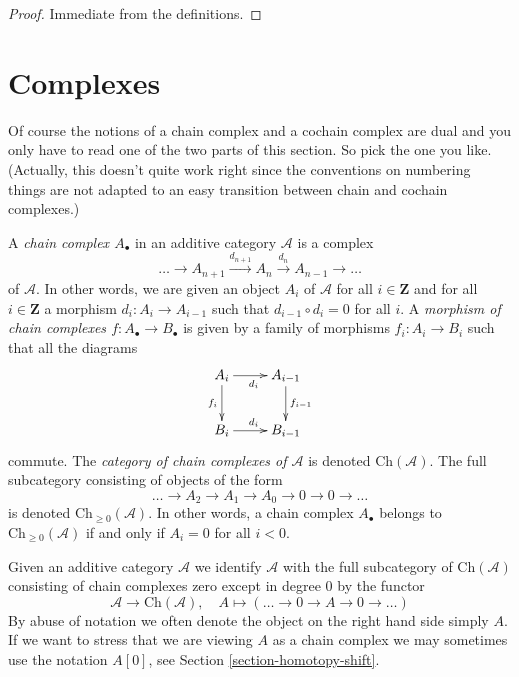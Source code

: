 \begin{proof}
Immediate from the definitions.
\end{proof}







\section{Complexes}
\label{section-complexes}

\noindent
Of course the notions of a chain complex and a cochain complex
are dual and you only have to read one of the two parts of
this section. So pick the one you like. (Actually, this doesn't
quite work right since the conventions on numbering things
are not adapted to an easy transition between chain and cochain
complexes.)

\medskip\noindent
A {\it chain complex $A_\bullet$} in an additive category $\mathcal{A}$
is a complex
$$
\ldots \to
A_{n + 1} \xrightarrow{d_{n + 1}}
A_n \xrightarrow{d_n}
A_{n - 1} \to
\ldots
$$
of $\mathcal{A}$. In other words, we are given an object $A_i$ of
$\mathcal{A}$ for all $i \in \mathbf{Z}$ and for
all $i \in \mathbf{Z}$ a morphism $d_i : A_i \to A_{i - 1}$ such that
$d_{i - 1} \circ d_i = 0$ for all $i$. A {\it morphism of chain
complexes $f : A_\bullet \to B_\bullet$} is given by a
family of morphisms $f_i : A_i \to B_i$ such that all
the diagrams
$$
\xymatrix{
A_i \ar[r]_{d_i} \ar[d]_{f_i} & A_{i - 1} \ar[d]^{f_{i - 1}} \\
B_i \ar[r]^{d_i} & B_{i - 1}
}
$$
commute. The {\it category of chain complexes of $\mathcal{A}$}
is denoted $\text{Ch}(\mathcal{A})$. The full subcategory consisting
of objects of the form
$$
\ldots \to A_2 \to A_1 \to A_0 \to 0 \to 0 \to \ldots
$$
is denoted $\text{Ch}_{\geq 0}(\mathcal{A})$.
In other words, a chain complex $A_\bullet$ belongs to
$\text{Ch}_{\geq 0}(\mathcal{A})$ if and only if
$A_i = 0$ for all $i < 0$.

\medskip\noindent
Given an additive category $\mathcal{A}$ we identify $\mathcal{A}$
with the full subcategory of $\text{Ch}(\mathcal{A})$ consisting
of chain complexes zero except in degree $0$ by the functor
$$
\mathcal{A} \longrightarrow \text{Ch}(\mathcal{A}),\quad
A \longmapsto (\ldots \to 0 \to A \to 0 \to \ldots)
$$
By abuse of notation we often denote the object on the right hand side
simply $A$. If we want to stress that we are viewing $A$ as a chain
complex we may sometimes use the notation $A[0]$, see
Section \ref{section-homotopy-shift}.

